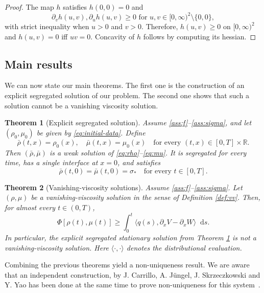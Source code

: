 \documentclass[a4paper,twosided, 11pt]{article}
\newcommand{\R}{\mathbb{R}}
\theoremstyle{plain}
\newtheorem{thm}{Theorem}[section]
\theoremstyle{remark}
\newcommand{\diff}{\mathop{} \mathrm{d}}
\numberwithin{equation}{section}
\begin{document}
\begin{proof}
The map $h$ satisfies $h(0,0) = 0$ and 
$$
\partial_vh(u,v), \partial_u h(u,v) \ge 0 \text{ for } u,v \in [0,\infty)^2 \setminus \{0,0\},
$$
with strict inequality when $u>0$ and $v>0$. Therefore, $h(u,v)\ge 0$ on $[0,\infty)^2 $ and $h(u,v)=0$ iff $uv=0$.
Concavity of $h$ follows by computing its hessian.  
\end{proof}

\subsection{Main results}

We can now state our main theorems. The first one is the construction of an explicit segregated solution of our problem. The second one shows that such a solution cannot be a vanishing viscosity solution.

\begin{thm}[Explicit segregated solution]
\label{thm:stationary}
Assume \ref{ass:f}--\ref{ass:sigma}, and let $(\rho_0,\mu_0)$ be given by \eqref{eq:initial-data}. Define
$$
\bar\rho(t,x)=\rho_0(x),
\quad
\bar\mu(t,x)=\mu_0(x)
\quad\text{for every }(t,x)\in[0,T]\times\R.
$$
Then $(\bar\rho,\bar\mu)$ is a weak solution of \eqref{eq:rho}--\eqref{eq:mu}. It is segregated for every time, has a single interface at $x=0$, and satisfies
$$
\bar\rho(t,0)=\bar\mu(t,0)=\sigma_* \quad\text{for every }t\in[0,T].
$$
\end{thm}
\begin{thm}[Vanishing-viscosity solutions]
\label{thm:vanishing}
Assume \ref{ass:f}--\ref{ass:sigma}. Let $(\rho,\mu)$ be a vanishing-viscosity solution in the sense of Definition \ref{def:vv}. Then, for almost every $t\in(0,T)$,
\begin{equation}\label{eq:entropyineq}
\Phi[\rho(t),\mu(t)]\ge \int_0^t \langle q(s),\partial_x V-\partial_x W\rangle\diff  s.
\end{equation}
In particular, the explicit segregated stationary solution from Theorem \ref{thm:stationary} is not a vanishing-viscosity solution. Here $\langle\cdot, \cdot \rangle$ denotes the distributional evaluation.
\end{thm}

Combining the previous theorems yield a non-uniqueness result. We are aware that an independent construction, by J. Carrillo, A. Jüngel, J. Skrzeczkowski and Y. Yao has been done at the same time to prove non-uniqueness for this system~\cite{jakub_nonunique}.
\end{document}
